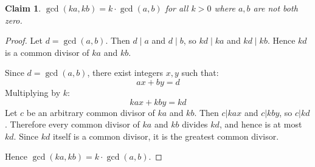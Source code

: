 \documentclass{article}
\newtheorem*{claim}{Claim}
\begin{document}
\begin{claim}
    $\gcd(ka, kb) = k \cdot \gcd(a, b)$ for all $k > 0$ where $a, b$ are not both zero.
\end{claim}

\begin{proof}
    Let $d = \gcd(a, b)$. Then $d \mid a$ and $d \mid b$, so $kd \mid ka$ and $kd \mid kb$. Hence $kd$ is a common
    divisor of $ka$ and $kb$.

    \medskip

    Since $d = \gcd(a, b)$, there exist integers $x, y$ such that:
    \[
    ax + by = d
    \]
    Multiplying by $k$:
    \[
    kax + kby = kd
    \]
    Let $c$ be an arbitrary common divisor of $ka$ and $kb$. Then $c | kax$ and $c | kby$, so $c | kd$. Therefore 
    every common divisor of $ka$ and $kb$ divides $kd$, and hence is at most $kd$. Since $kd$ itself is a common 
    divisor, it is the greatest common divisor.
    
    \medskip

    Hence $\gcd(ka, kb) = k \cdot \gcd(a, b)$.
\end{proof}
\end{document}
